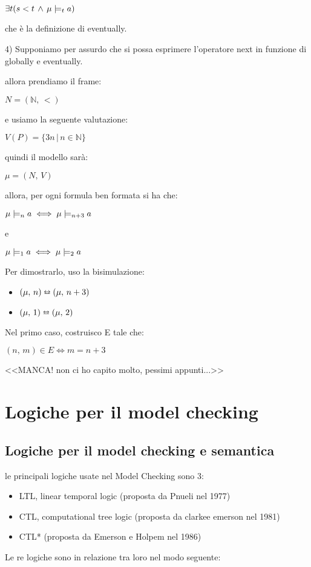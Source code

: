 $\exists t(s<t\,\wedge\,\mu\models_{t}a)$

che è la definizione di eventually.

4) Supponiamo per assurdo che si possa esprimere l'operatore next
in funzione di globally e eventually.

allora prendiamo il frame:

$N=(\mathbb{N},\,<)$

e usiamo la seguente valutazione:

$V(P)=\{3n\,|\, n\in\mathbb{N}\}$

quindi il modello sarà:

$\mu=(N,\, V)$

allora, per ogni formula ben formata si ha che:

$\mu\models_{n}a\iff\mu\models_{n+3}a$

e

$\mu\models_{1}a\iff\mu\models_{2}a$

Per dimostrarlo, uso la bisimulazione:
\begin{itemize}
\item $(\mu,\, n)\leftrightarroweq(\mu,\, n+3)$
\item $(\mu,\,1)\leftrightarroweq(\mu,\,2)$
\end{itemize}
Nel primo caso, costruisco E tale che:

$(n,\, m)\in E\iff m=n+3$

<\textcompwordmark{}<MANCA! non ci ho capito molto, pessimi appunti...>\textcompwordmark{}>


\section{Logiche per il model checking}


\subsection{Logiche per il model checking e semantica}

le principali logiche usate nel Model Checking sono 3:
\begin{itemize}
\item LTL, linear temporal logic (proposta da Pnueli nel 1977)
\item CTL, computational tree logic (proposta da clarkee emerson nel 1981)
\item CTL{*} (proposta da Emerson e Holpem nel 1986)
\end{itemize}
Le re logiche sono in relazione tra loro nel modo seguente:

